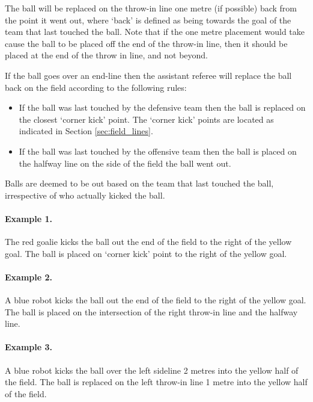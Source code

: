 \documentclass[12pt]{article}
\begin{document}
The ball will be replaced on the throw-in line one metre (if possible)
back from the point it went out, where `back' is defined as being towards
the goal of the team that last touched the ball. Note that if the one metre placement would take cause the ball to be placed
off the end of the throw-in line, then it should be placed at the end of the throw in line, and not beyond.

If the ball goes over an end-line then the assistant referee will
replace the ball back on the field according to the following rules:
\begin{itemize}
\item If the ball was last touched by the defensive team then the ball
  is replaced on the closest `corner kick' point. The `corner kick'
  points are located as indicated in Section \ref{sec:field_lines}.
\item If the ball was last touched by the offensive team then the ball
  is placed on the halfway line on the side of the field the ball went
  out.
\end{itemize}

Balls are deemed to be out based on the team that last touched the
ball, irrespective of who actually kicked the ball.

\paragraph{Example 1.} The red goalie kicks the ball out the end of the
field to the right of the yellow goal.  The ball is placed on `corner kick' point
to the right of the yellow goal.

\paragraph{Example 2.} A blue robot kicks the ball out the end of the
field to the right of the yellow goal. The ball is placed on the intersection
of the right throw-in line and the halfway line.

\paragraph{Example 3.} A blue robot kicks the ball over the left
sideline 2 metres into the yellow half of the field. The ball is
replaced on the left throw-in line 1 metre into the yellow half of the field.

\end{document}
